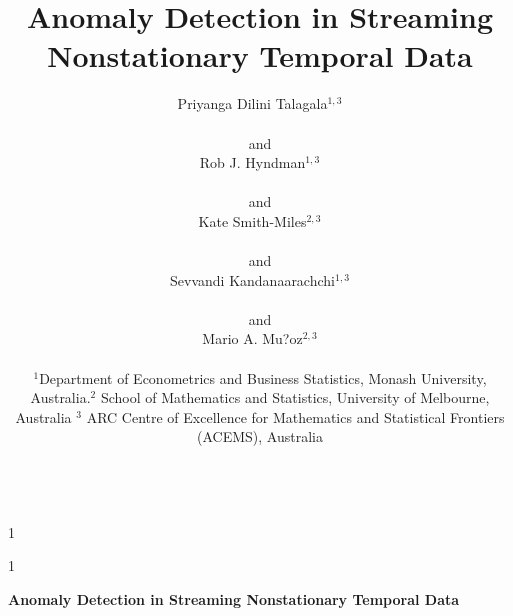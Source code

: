 \documentclass[12pt]{article}
\newcommand{\blind}{1}
\begin{document}
\def\spacingset#1{\renewcommand{\baselinestretch}%
{#1}\small\normalsize} \spacingset{1}



\blind
{
  \title{\bf Anomaly Detection in Streaming Nonstationary Temporal Data}

  \author{
        Priyanga Dilini Talagala\(^{1, 3}\) \\
    \vspace*{-0.7cm}\\
     and \\     Rob J. Hyndman\(^{1, 3}\) \\
    \vspace*{-0.7cm}\\
     and \\     Kate Smith-Miles\(^{2, 3}\) \\
    \vspace*{-0.7cm}\\
     and \\     Sevvandi Kandanaarachchi\(^{1, 3}\) \\
    \vspace*{-0.7cm}\\
     and \\     Mario A. Mu?oz\(^{2, 3}\) \\
    \parbox{14cm}{$^1$\small{Department of Econometrics and Business Statistics, Monash University, Australia}.\newline $^2$ \small{School of Mathematics and Statistics, University of Melbourne, Australia} \newline $^3$ \small{ARC Centre of Excellence for Mathematics and Statistical Frontiers (ACEMS), Australia}}\\
      }
  \maketitle
} \fi

\blind
{
  \bigskip
  \bigskip
  \bigskip
  \begin{center}
    {\LARGE\bf Anomaly Detection in Streaming Nonstationary Temporal Data}
  \end{center}
  \medskip
} \fi
\end{document}
